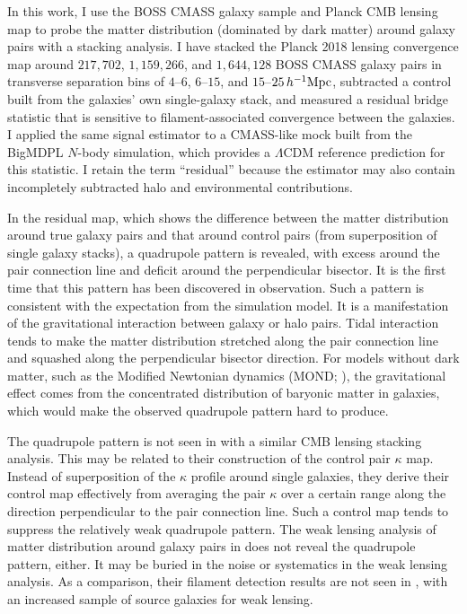 \documentclass[11pt,letterpaper]{article}
\newcommand{\hinvMpc}{h^{-1}{\rm Mpc}}
\begin{document}
In this work, I use the BOSS CMASS galaxy sample and Planck CMB lensing map to probe the matter distribution (dominated by dark matter) around galaxy pairs with a stacking analysis. I have stacked the Planck 2018 lensing convergence map around $217{,}702$,
$1{,}159{,}266$, and $1{,}644{,}128$ BOSS CMASS galaxy pairs in transverse
separation bins of $4$--$6$, $6$--$15$, and $15$--$25\,\hinvMpc$,
subtracted a control built from the galaxies' own single-galaxy stack, and
measured a residual bridge statistic that is sensitive to filament-associated
convergence between the galaxies. I applied the same signal estimator to a
CMASS-like mock built from the BigMDPL $N$-body simulation, which provides a
$\Lambda$CDM reference prediction for this statistic. I retain the term
``residual'' because the estimator may also contain incompletely subtracted
halo and environmental contributions.

In the residual map, which shows the difference between the matter distribution around true galaxy pairs and that around control pairs (from superposition of single galaxy stacks), a quadrupole pattern is revealed, with excess around the pair connection line and deficit around the perpendicular bisector. It is the first time that this pattern has been discovered in observation. Such a pattern is consistent with the expectation from the simulation model. It is a manifestation of the gravitational interaction between galaxy or halo pairs. Tidal interaction tends to make the matter distribution stretched along the pair connection line and squashed along the perpendicular bisector direction. For models without dark matter, such as the Modified Newtonian dynamics (MOND; \citealt{Milgrom1983}), the gravitational effect comes from the concentrated distribution of baryonic matter in galaxies, which would make the observed quadrupole pattern hard to produce. 

The quadrupole pattern is not seen in \citet{deGraaff2019} with a similar CMB lensing stacking analysis. This may be related to their construction of the control pair $\kappa$ map. Instead of superposition of the $\kappa$ profile around single galaxies, they derive their control map effectively from averaging the pair $\kappa$ over a certain range along the direction perpendicular to the pair connection line. Such a control map tends to suppress the relatively weak quadrupole pattern. The weak lensing analysis of matter distribution around galaxy pairs in \citet{EppsHudson2017} does not reveal the quadrupole pattern, either. It may be buried in the noise or systematics in the weak lensing analysis. As a comparison, their filament detection results are not seen in \citet{Xia2020}, with an increased sample of source galaxies for weak lensing.
\end{document}
